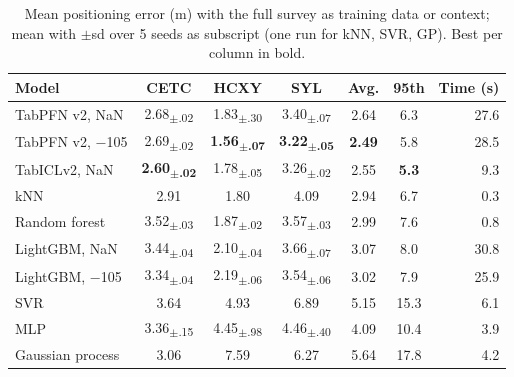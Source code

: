 \begin{table}[t]
\centering
\caption{Mean positioning error (m) with the full survey as training data or context; mean with $\pm$sd over 5 seeds as subscript (one run for kNN, SVR, GP). Best per column in bold.}
\label{tab:full}
\setlength{\tabcolsep}{3pt}
\footnotesize
\begin{tabular}{@{}lcccccr@{}}
\toprule
Model & CETC & HCXY & SYL & Avg. & 95th & Time (s) \\
\midrule
TabPFN v2, NaN & 2.68\textsubscript{$\pm$.02} & 1.83\textsubscript{$\pm$.30} & 3.40\textsubscript{$\pm$.07} & 2.64 & 6.3 & 27.6 \\
TabPFN v2, $-$105 & 2.69\textsubscript{$\pm$.02} & \textbf{1.56\textsubscript{$\pm$.07}} & \textbf{3.22\textsubscript{$\pm$.05}} & \textbf{2.49} & 5.8 & 28.5 \\
TabICLv2, NaN & \textbf{2.60\textsubscript{$\pm$.02}} & 1.78\textsubscript{$\pm$.05} & 3.26\textsubscript{$\pm$.02} & 2.55 & \textbf{5.3} & 9.3 \\
\midrule
kNN & 2.91 & 1.80 & 4.09 & 2.94 & 6.7 & 0.3 \\
Random forest & 3.52\textsubscript{$\pm$.03} & 1.87\textsubscript{$\pm$.02} & 3.57\textsubscript{$\pm$.03} & 2.99 & 7.6 & 0.8 \\
LightGBM, NaN & 3.44\textsubscript{$\pm$.04} & 2.10\textsubscript{$\pm$.04} & 3.66\textsubscript{$\pm$.07} & 3.07 & 8.0 & 30.8 \\
LightGBM, $-$105 & 3.34\textsubscript{$\pm$.04} & 2.19\textsubscript{$\pm$.06} & 3.54\textsubscript{$\pm$.06} & 3.02 & 7.9 & 25.9 \\
SVR & 3.64 & 4.93 & 6.89 & 5.15 & 15.3 & 6.1 \\
MLP & 3.36\textsubscript{$\pm$.15} & 4.45\textsubscript{$\pm$.98} & 4.46\textsubscript{$\pm$.40} & 4.09 & 10.4 & 3.9 \\
Gaussian process & 3.06 & 7.59 & 6.27 & 5.64 & 17.8 & 4.2 \\
\bottomrule
\end{tabular}
\end{table}

